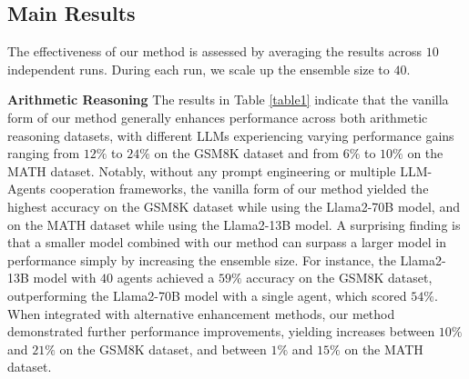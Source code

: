 \subsection{Main Results}
\label{sec:main_results}
The effectiveness of our method is assessed by averaging the results across $10$ independent runs. During each run, we scale up the ensemble size to $40$.

\textbf{Arithmetic Reasoning} The results in Table \ref{table1} indicate that the vanilla form of our method generally enhances performance across both arithmetic reasoning datasets, with different LLMs experiencing varying performance gains ranging from $12\%$ to $24\%$ on the GSM8K dataset and from $6\%$ to $10\%$ on the MATH dataset. Notably, without any prompt engineering or multiple LLM-Agents cooperation frameworks, the vanilla form of our method yielded the highest accuracy on the GSM8K dataset while using the Llama2-70B model, and on the MATH dataset while using the Llama2-13B model. A surprising finding is that a smaller model combined with our method can surpass a larger model in performance simply by increasing the ensemble size. For instance, the Llama2-13B model with $40$ agents achieved a $59\%$ accuracy on the GSM8K dataset, outperforming the Llama2-70B model with a single agent, which scored $54\%$. When integrated with alternative enhancement methods, our method demonstrated further performance improvements, yielding increases between $10\%$ and $21\%$ on the GSM8K dataset, and between $1\%$ and $15\%$ on the MATH dataset.


